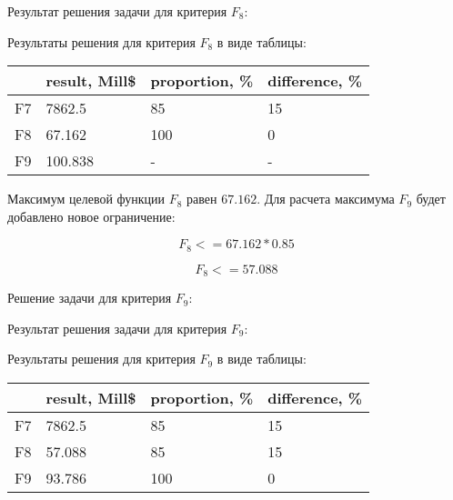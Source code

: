\documentclass[14pt,a4paper,report]{report}
\begin{document}


Результат решения задачи для критерия $F_8$:



Результаты решения для критерия $F_8$ в виде таблицы:

\begin{table}[h!]
	\centering
	\bgroup
	\def\arraystretch{1}
	\begin{tabular}{ | m{1.2cm} | m{1.9cm} | m{2.2cm} | m{2.2cm} | }
		\hline
		& result, Mill\$ & proportion, \% & difference, \% \\ \hline
		F7 & 7862.5 & 85 & 15 \\ \hline
		F8 & 67.162 & 100 & 0 \\ \hline
		F9 & 100.838 & - & - \\
		\hline
	\end{tabular}
	\egroup
\end{table}

Максимум целевой функции $F_8$ равен $67.162$. Для расчета максимума $F_9$ будет добавлено новое ограничение:

\begin{equation*}
\text{$F_8<=67.162*0.85$}
\end{equation*}

\begin{equation*}
\text{$F_8<=57.088$}
\end{equation*}

Решение задачи для критерия $F_9$:



Результат решения задачи для критерия $F_9$:



Результаты решения для критерия $F_9$ в виде таблицы:

\begin{table}[h!]
	\centering
	\bgroup
	\def\arraystretch{1}
	\begin{tabular}{ | m{1.2cm} | m{1.9cm} | m{2.2cm} | m{2.2cm} | }
		\hline
		& result, Mill\$ & proportion, \% & difference, \% \\ \hline
		F7 & 7862.5 & 85 & 15 \\ \hline
		F8 & 57.088 & 85 & 15 \\ \hline
		F9 & 93.786 & 100 & 0 \\
		\hline
	\end{tabular}
	\egroup
\end{table}
\end{document}
